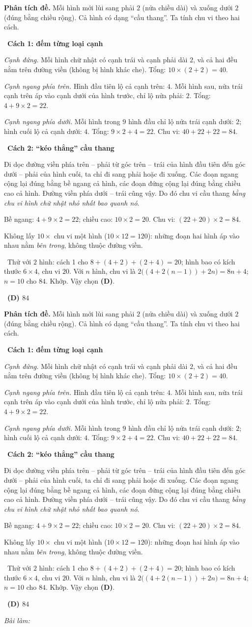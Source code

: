 \documentclass[11pt]{article}
\newif\ifsol \soltrue
\providecommand{\AnsWord}{Đáp số}
\newcommand{\StuProb}[2]{\begin{probboxS}{#1}{#2}\StuProbBody\end{probboxS}}
\newcommand{\ans}[1]{\par\smallskip{\bfseries\color{tmGreen!88!black}\AnsWord:}\ {\bfseries\color{AnsRed}#1}\par}
\newcommand{\probsol}[1]{%
  \begin{lrbox}{\solmeasure}\begin{minipage}{\dimexpr\linewidth-24pt\relax}#1\end{minipage}\end{lrbox}%
  \ifsol
    \begin{solbox}#1\end{solbox}%
  \else
    \setlength{\solht}{\dimexpr\ht\solmeasure+\dp\solmeasure+0.85cm\relax}%
    \ifdim\solht<1.35cm\setlength{\solht}{1.35cm}\fi
    \ifdim\solht>\StudentMaxWork\setlength{\solht}{\StudentMaxWork}\fi
    \par\noindent\begin{minipage}{\linewidth}%
    \expandafter\StuProb\StuProbArgs
    \begin{tcolorbox}[colback=white,colframe=Line,boxrule=0.8pt,arc=5pt,
      left=8pt,right=8pt,top=4pt,bottom=4pt,height=\solht]{\footnotesize\color{Slate}\itshape\WorkWord}\end{tcolorbox}%
    \end{minipage}\par\medskip
  \fi}
\newlength{\StudentMaxWork}\setlength{\StudentMaxWork}{4.5cm}
\newcommand{\step}[2]{\par\smallskip\noindent{\bfseries\color{tmBlue!85!black}\StepWord~#1.}\ {\bfseries #2}\par\nopagebreak}
\newcommand{\verify}[1]{\par\smallskip\noindent{\bfseries\color{tmGreen!80!black}\faCheckCircle\ \CheckWord}\ #1\par}
\def\WorkWord{Bài làm:}
\def\AnsWord{Đáp số}
\def\StepWord{Bước}
\def\CheckWord{Thử lại:}
\begin{document}
\probsol{
\textbf{Phân tích đề.} Mỗi hình mới lùi sang phải $2$ (nửa chiều dài) và xuống dưới $2$ (đúng bằng chiều
rộng). Cả hình có dạng ``cầu thang''. Ta tính chu vi theo hai cách.

\step{1}{Cách 1: đếm từng loại cạnh}
\emph{Cạnh đứng.} Mỗi hình chữ nhật có cạnh trái và cạnh phải dài $2$, và cả hai đều nằm trên đường viền
(không bị hình khác che). Tổng: $10\times(2+2)=40$.

\emph{Cạnh ngang phía trên.} Hình đầu tiên lộ cả cạnh trên: $4$. Mỗi hình sau, nửa trái cạnh trên áp vào
cạnh dưới của hình trước, chỉ lộ nửa phải: $2$. Tổng: $4+9\times 2=22$.

\emph{Cạnh ngang phía dưới.} Mỗi hình trong $9$ hình đầu chỉ lộ nửa trái cạnh dưới: $2$; hình cuối lộ cả
cạnh dưới: $4$. Tổng: $9\times 2+4=22$. Chu vi: $40+22+22=84$.

\step{2}{Cách 2: ``kéo thẳng'' cầu thang}
\begin{proofbox}Đi dọc đường viền phía trên -- phải từ góc trên -- trái của hình đầu tiên đến góc dưới --
phải của hình cuối, ta chỉ đi sang phải hoặc đi xuống. Các đoạn ngang cộng lại đúng bằng bề ngang cả hình,
các đoạn đứng cộng lại đúng bằng chiều cao cả hình. Đường viền phía dưới -- trái cũng vậy. Do đó chu vi
cầu thang \emph{bằng chu vi hình chữ nhật nhỏ nhất bao quanh nó}.\end{proofbox}
Bề ngang: $4+9\times 2=22$; chiều cao: $10\times 2=20$. Chu vi: $(22+20)\times 2=84$.

\begin{warnbox}Không lấy $10\times$ chu vi một hình ($10\times 12=120$): những đoạn hai hình áp vào nhau
nằm \emph{bên trong}, không thuộc đường viền.\end{warnbox}
\verify{Thử với $2$ hình: cách 1 cho $8+(4+2)+(2+4)=20$; hình bao có kích thước $6\times 4$, chu vi $20$.
Với $n$ hình, chu vi là $2\big((4+2(n-1))+2n\big)=8n+4$; $n=10$ cho $84$. Khớp. Vậy chọn \textbf{(D)}.}
\ans{(D) $84$}
}
\end{document}
